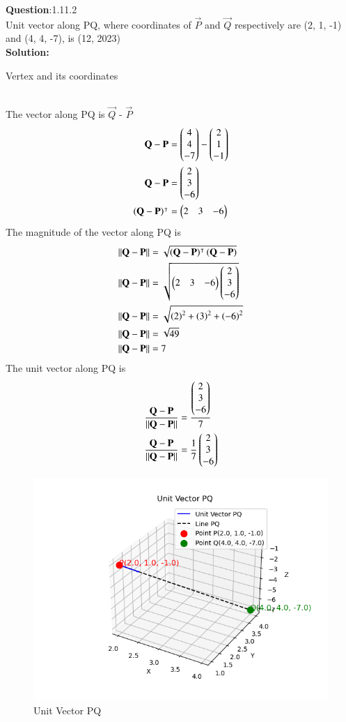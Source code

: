 \documentclass[journal]{IEEEtran}
\begin{document}
\textbf{Question}:1.11.2\\
Unit vector along PQ, where coordinates of $\vec{P}$ and $\vec{Q}$ respectively are (2, 1, -1) and (4, 4, -7), is \hfill(12, 2023)
\\
\textbf{Solution:}
\renewcommand{\tablename}{Table 1.11.2.1}
\begin{table}[h!]
  \centering
  
  \caption{Vertex and its coordinates}
\end{table}
\\
The vector along PQ is $\vec{Q}$ - $\vec{P}$
    \begin{align}
    \mathbf{Q} - \mathbf{P} & = \begin{pmatrix}4 \\ 4 \\ -7\end{pmatrix} - \begin{pmatrix}2 \\ 1 \\ -1\end{pmatrix} \\
    \mathbf{Q} - \mathbf{P} & = \begin{pmatrix}2 \\ 3 \\ -6\end{pmatrix} \\
    \left(\mathbf{Q} - \mathbf{P}\right)^\intercal & = \begin{pmatrix}2 & 3 & -6\end{pmatrix}
 \end{align}
The magnitude of the vector along PQ is
\begin{align}
\left\lVert\mathbf{Q} - \mathbf{P}\right\rVert & = \sqrt{\left(\mathbf{Q} - \mathbf{P}\right)^\intercal\left(\mathbf{Q} - \mathbf{P}\right)} \\
   \left\lVert\mathbf{Q} - \mathbf{P}\right\rVert & = \sqrt{\begin{pmatrix}2 & 3 & -6\end{pmatrix} \begin{pmatrix}2 \\ 3 \\ -6\end{pmatrix}} \\
   \left\lVert\mathbf{Q} - \mathbf{P}\right\rVert & = \sqrt{\left(2\right)^2 + \left(3\right)^2 + \left(-6\right)^2} \\
   \left\lVert\mathbf{Q} - \mathbf{P}\right\rVert & = \sqrt{49} \\
   \left\lVert\mathbf{Q} - \mathbf{P}\right\rVert & = 7 
\end{align}
The unit vector along PQ is 
\begin{align}
    \frac{\mathbf{Q} - \mathbf{P}}{\left\lVert\mathbf{Q} - \mathbf{P}\right\rVert} & = \frac{\begin{pmatrix}2 \\ 3 \\-6\end{pmatrix}}{7} \\
    \frac{\mathbf{Q} - \mathbf{P}}{\left\lVert\mathbf{Q} - \mathbf{P}\right\rVert} & = \frac{1}{7}\begin{pmatrix}2 \\ 3 \\ -6\end{pmatrix}
\end{align}
\begin{figure}[h!]
   \centering
   \includegraphics[width=0.7\linewidth]{figs/unit.png}
	\caption{Unit Vector PQ}
   \end{figure}
   
\end{document}
